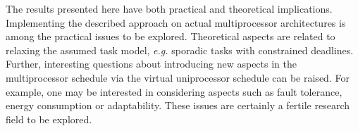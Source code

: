 \documentclass[twocolumn, compsocconf]{IEEEtran}
\newcounter{proc}
\begin{document}
The results presented here have both practical and theoretical
implications. Implementing the described approach on actual multiprocessor
architectures is among the practical issues to be explored. Theoretical aspects
are related to relaxing the assumed task model, \textit{e.g.} sporadic tasks
with constrained deadlines. Further, interesting questions about introducing new
aspects in the multiprocessor schedule via the virtual uniprocessor schedule can
be raised. For example, one may be interested in considering aspects such as
fault tolerance, energy consumption or adaptability. These issues are certainly
a fertile research field to be explored.




\end{document}

